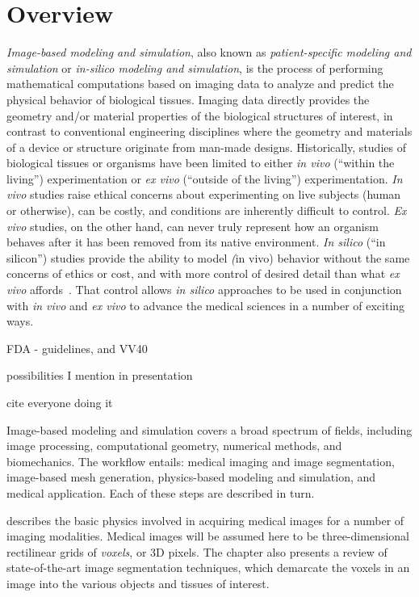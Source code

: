 \chapter{Overview}
%

\textit{Image-based modeling and simulation}, also known as \textit{patient-specific modeling and simulation} or \textit{in-silico modeling and simulation}, is the process of performing mathematical computations based on imaging data to analyze and predict the physical behavior of biological tissues. Imaging data directly provides the geometry and/or material properties of the biological structures of interest, in contrast to conventional engineering disciplines where the geometry and materials of a device or structure originate from man-made designs. Historically, studies of biological tissues or organisms have been limited to either \textit{in vivo} (``within the living'') experimentation or \textit{ex vivo} (``outside of the living'') experimentation. \textit{In vivo} studies raise ethical concerns about experimenting on live subjects (human or otherwise), can be costly, and conditions are inherently difficult to control. \textit{Ex vivo} studies, on the other hand, can never truly represent how an organism behaves after it has been removed from its native environment. \textit{In silico} (``in silicon'') studies provide the ability to model \textit(in vivo) behavior without the same concerns of ethics or cost, and with more control of desired detail than what \textit{ex vivo} affords~\cite{colquitt_2011}. That control allows \textit{in silico} approaches to be used in conjunction with \textit{in vivo} and \textit{ex vivo} to advance the medical sciences in a number of exciting ways.

FDA - guidelines, and VV40

possibilities I mention in presentation

cite everyone doing it


Image-based modeling and simulation covers a broad spectrum of fields, including image processing, computational geometry, numerical methods, and biomechanics. The workflow entails: medical imaging and image segmentation, image-based mesh generation, physics-based modeling and simulation, and medical application. Each of these steps are described in turn.

 describes the basic physics involved in acquiring medical images for a number of imaging modalities. Medical images will be assumed here to be three-dimensional rectilinear grids of \textit{voxels}, or 3D pixels. The chapter also presents a review of state-of-the-art image segmentation techniques, which demarcate the voxels in an image into the various objects and tissues of interest.

